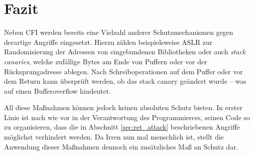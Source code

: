\section{Fazit}
Neben CFI werden bereits eine Vielzahl anderer Schutzmechanismen gegen derartige Angriffe eingesetzt. Hierzu zählen beispielsweise ASLR zur Randomisierung der Adressen von eingebundenen Bibliotheken oder auch \emph{stack canaries}, welche zufällige Bytes am Ende von Puffern oder vor der Rücksprungadresse ablegen. Nach Schreiboperationen auf dem Puffer oder vor dem Return kann überprüft werden, ob das stack canary geändert wurde -- was auf einen Bufferoverflow hindeutet.

All diese Maßnahmen können jedoch keinen absoluten Schutz bieten. In erster Linie ist nach wie vor in der Verantwortung des Programmierers, seinen Code so zu organisieren, dass die in Abschnitt \ref{sec:ret_attack} beschriebenen Angriffe möglichst verhindert werden. Da Irren nun mal menschlich ist, stellt die Anwendung dieser Maßnahmen dennoch ein zusätzliches Maß an Schutz dar.

\printbibliography

